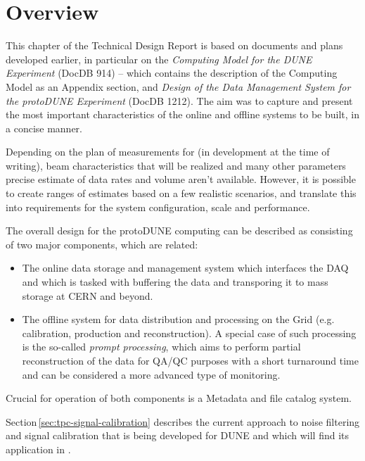 \section{Overview}

This chapter of the Technical Design Report is based on documents and plans developed earlier, in particular
on the \textit{Computing Model for the DUNE Experiment} (DocDB 914) -- which contains the description
of the \pd Computing Model as an Appendix section, and \textit{Design of the Data Management System for the protoDUNE Experiment}
(DocDB 1212). The aim was to capture and present the most important characteristics of the online and offline systems to be built, in a concise manner.

Depending on the plan of measurements for \pd
(in development at the time of writing), beam characteristics that will be realized
and many other parameters precise estimate of data rates and volume aren't available. However, it is possible to create ranges
of estimates based on a few realistic scenarios, and translate this into requirements for the system configuration, scale and
performance.

The overall design for the protoDUNE computing can be described as consisting of two major components, which are related:
\begin{itemize}
\item The online data storage and management system which interfaces the DAQ and which is tasked with buffering
the data and transporing it to mass storage at CERN and beyond.
\item The offline system for data distribution and processing on the Grid (e.g. calibration, production and reconstruction). A special case
of such processing is the so-called \textit{prompt processing}, which aims to perform partial reconstruction of the data for QA/QC purposes
with a short turnaround time and can be considered a more advanced type of monitoring.
\end{itemize}

\noindent Crucial for operation of both components is a Metadata and file catalog system.

Section\,\ref{sec:tpc-signal-calibration} describes the current approach to noise filtering and signal calibration that is being
developed for DUNE and which will find its application in \pd.


